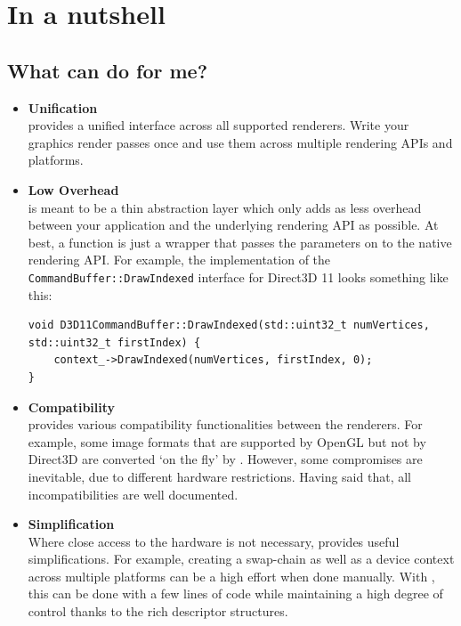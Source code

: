 \documentclass{article}
\begin{document}
\section{In a nutshell}

\subsection{What can \LLGL do for me?}

\begin{itemize}
	\item \textbf{Unification} \\
	\LLGL provides a unified interface across all supported renderers.
	Write your graphics render passes once and use them across multiple rendering APIs and platforms.
	
	\item \textbf{Low Overhead} \\
	\LLGL is meant to be a thin abstraction layer which only adds as less overhead between your application and the underlying rendering API as possible.
	At best, a function is just a wrapper that passes the parameters on to the native rendering API.
	For example, the implementation of the \texttt{CommandBuffer::DrawIndexed} interface for Direct3D 11 looks something like this:
\begin{lstlisting}
void D3D11CommandBuffer::DrawIndexed(std::uint32_t numVertices, std::uint32_t firstIndex) {
    context_->DrawIndexed(numVertices, firstIndex, 0);
}
\end{lstlisting}
	
	\item \textbf{Compatibility} \\
	\LLGL provides various compatibility functionalities between the renderers.
	For example, some image formats that are supported by OpenGL but not by Direct3D are converted `on the fly' by \LLGL.
	However, some compromises are inevitable, due to different hardware restrictions.
	Having said that, all incompatibilities are well documented.
	
	\item \textbf{Simplification} \\
	Where close access to the hardware is not necessary, \LLGL provides useful simplifications.
	For example, creating a swap-chain as well as a device context across multiple platforms can be a high effort when done manually.
	With \LLGL, this can be done with a few lines of code while maintaining a high degree of control thanks to the rich descriptor structures.
	

\end{itemize}
\end{document}
